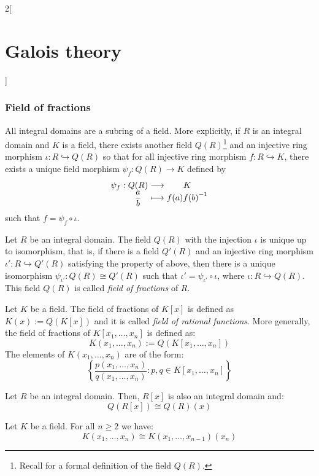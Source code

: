 \documentclass[../../../main_math.tex]{subfiles}
\begin{document}
\begin{multicols}{2}[\section{Galois theory}]
  \subsubsection{Field of fractions}
  \begin{theorem}
    All integral domains are a subring of a field. More explicitly, if $R$ is an integral domain and $K$ is a field, there exists another field $Q(R)$\footnote{Recall  for a formal definition of the field $Q(R)$.} and an injective ring morphism $\iota:R\hookrightarrow Q(R)$ so that for all injective ring morphism $f:R\hookrightarrow K$, there exists a unique field morphism $\psi_f:Q(R)\rightarrow K$ defined by
    $$
      \function{\psi_f}{Q(R)}{K}{\displaystyle\frac{a}{b}}{f(a){f(b)}^{-1}}
    $$
    such that $f=\psi_f\circ\iota$.
  \end{theorem}
  \begin{corollary}
    Let $R$ be an integral domain. The field $Q(R)$ with the injection $\iota$ is unique up to isomorphism, that is, if there is a field $Q'(R)$ and an injective ring morphism $\iota':R\hookrightarrow Q'(R)$ satisfying the property of above, then there is a unique isomorphism $\psi_{\iota'}:Q(R)\cong Q'(R)$ such that $\iota'=\psi_{\iota'}\circ\iota$, where $\iota:R\hookrightarrow Q(R)$. This field $Q(R)$ is called \emph{field of fractions} of $R$.
  \end{corollary}
  \begin{definition}
    Let $K$ be a field. The field of fractions of $K[x]$ is defined as $K(x):=Q(K[x])$ and it is called \emph{field of rational functions}. More generally, the field of fractions of $K[x_1,\ldots,x_n]$ is defined as: $$K(x_1,\ldots,x_n):=Q(K[x_1,\ldots,x_n])$$ The elements of $K(x_1,\ldots,x_n)$ are of the form: $$\left\{\frac{p(x_1,\ldots,x_n)}{q(x_1,\ldots,x_n)}:p,q\in K[x_1,\ldots,x_n]\right\}$$
  \end{definition}
  \begin{lemma}
    Let $R$ be an integral domain. Then, $R[x]$ is also an integral domain and: $$Q(R[x])\cong Q(R)(x)$$
  \end{lemma}
  \begin{corollary}
    Let $K$ be a field. For all $n\geq 2$ we have: $$K(x_1,\ldots,x_n)\cong K(x_1,\ldots,x_{n-1})(x_n)$$
  \end{corollary}

\end{multicols}
\end{document}
